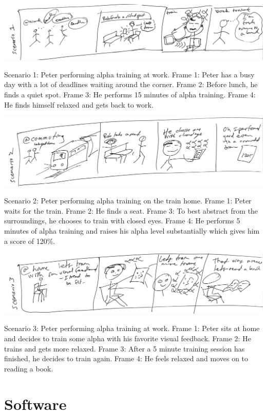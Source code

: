 \documentclass[a4paper,10pt,english,lof,lot,twoside]{puthesis}
\begin{document}
{\hfill\includegraphics[width=1.000\linewidth]{design-scenario-work.png}\hfill}

Scenario 1: Peter performing alpha training at work. Frame 1: Peter has a busy day with a lot of deadlines waiting around the corner. Frame 2: Before lunch, he finds a quiet spot. Frame 3: He performs 15 minutes of alpha training. Frame 4: He finds himself relaxed and gets back to work.

{\hfill\includegraphics[width=1.000\linewidth]{design-scenario-commuting.png}\hfill}

Scenario 2: Peter performing alpha training on the train home. Frame 1: Peter waits for the train. Frame 2: He finds a seat. Frame 3: To best abstract from the surroundings, he chooses to train with closed eyes. Frame 4: He performs 5 minutes of alpha training and raises his alpha level substantially which gives him a score of 120\%.

{\hfill\includegraphics[width=1.000\linewidth]{design-scenario-home.png}\hfill}

Scenario 3: Peter performing alpha training at work. Frame 1: Peter sits at home and decides to train some alpha with his favorite visual feedback. Frame 2: He trains and gets more relaxed. Frame 3: After a 5 minute training session has finished, he decides to train again. Frame 4: He feels relaxed and moves on to reading a book.
\label{appendix_software::doc}

\chapter{Software}
\label{appendix_software:appendix-software}\label{appendix_software:software}
\end{document}
